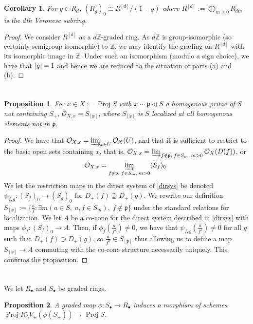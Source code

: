 \documentclass[english,letter,doublesided]{article}
\DeclarePairedDelimiter\abs{\lvert}{\rvert}%
\newcommand{\ZZ}{\mathbb{Z}}
\newcommand{\OO}{\mathcal{O}}
\newcommand{\pfr}{\mathfrak{p}}
\newcommand{\ldt}{\bullet}
\newcommand{\prob}[1]{\setcounter{section}{#1-1}\section{}}
\newcommand{\prt}[1]{\setcounter{subsection}{#1-1}\subsection{}}
\newtheorem*{prop*}{Proposition}
\newtheorem*{cor*}{Corollary}
\theoremstyle{remark}
\theoremstyle{definition}
\newcommand{\colim}{\varinjlim}
\DeclareMathOperator{\proj}{Proj}
\newcommand{\hol}[2]{{#1}_{[#2]}}
\begin{document}
\prt{3}
\begin{cor*}
For $g\in R_d$, $(R_g)_0\cong R^{[d]}/(1-g)$ where $R^{[d]}:=\bigoplus_{m\geq 0}R_{dm}$ is the $d$th Veronese subring. 
\end{cor*}
\begin{proof}
	We consider $R^{[d]}$ as a $d\ZZ$-graded ring. As $d\ZZ$ is group-isomorphic (so certainly semigroup-isomorphic) to $\ZZ$, we may identify the grading on $R^{[d]}$ with its isomorphic image in $\ZZ$. Under such an isomorphism (modulo a sign choice), we have that $\abs{g}=1$ and hence we are reduced to the situation of parts (a) and (b).
\end{proof}
\prob{4} \begin{prop*}
	For $x\in X:=\proj S$ with $x\sim \pfr\triangleleft S$ a homogenous prime of $S$ not containing $S_+$, $\OO_{X,x}=S_{[\pfr]}$, where $\hol{S}{\pfr}$ is $S$ localized at all homogenous elements not in $\pfr$. 
\end{prop*}
\begin{proof}
	We have that $\OO_{X,x}=\colim_{x\in U}\OO_X(U)$, and that it is sufficient to restrict to the basic open sets containing $x$, that is, $\OO_{X,x}=\colim_{f\notin \pfr;\;f\in S_m,\,m>0}\OO_{X}(D(f))$, or \begin{equation}\OO_{X,x}=\colim_{f\notin \pfr;\;f\in S_m,\,m>0}(S_f)_0\label{dirsys}.\end{equation} We let the restriction maps in the direct system of \eqref{dirsys} be denoted $\psi_{f,g}:(S_f)_0\to (S_g)_0$ for $D_+(f)\supseteq D_+(g)$. We rewrite our definition $\hol{S}{\pfr}:=\{\frac{a}{f}:\exists m( a\in S,\;a,f\in S_m),\;f\notin \pfr\}$ under the standard relations for localization. We let $A$ be a co-cone for the direct system described  in \eqref{dirsys} with maps $\phi_f:(S_f)_0\to A$. Then, if $\phi_f(\frac{a}{f^k})\neq 0$, we have that $\psi_{f,g}(\frac{a}{f^k})\neq 0$ for all $g$ such that $D_+(f)\supset D_+(g)$, so $\frac{a}{f^k}\in \hol{S}{\pfr}$ thus allowing us to define a map $\hol{S}{\pfr}\to A$ commuting with the co-cone structure necessarily uniquely. This confirms the proposition.
\end{proof}
\prob{5} We let $R_\ldt$ and $S_\ldt$ be graded rings.
\begin{prop*}
	A graded map $\phi:S_\ldt\to R_\ldt$ induces a morphism of schemes $\proj R\setminus V_+(\phi(S_+))\to \proj S$.
\end{prop*}
\end{document}
